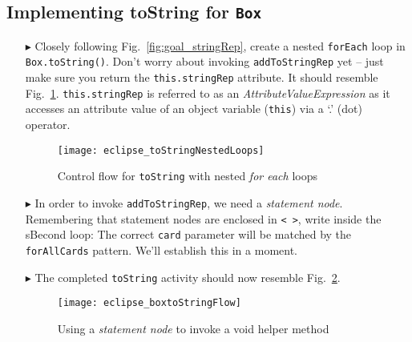 \newpage
\hypertarget{stringRep tex}{}
\subsection{Implementing toString for \texttt{Box}}
\texHeader

\vspace{0.5cm}

\begin{itemize}
  
\item[$\blacktriangleright$] Closely following Fig.~\ref{fig:goal_stringRep}, create a nested \texttt{forEach} loop in \texttt{Box.\-to\-Str\-ing()}.
Don't worry about invoking \texttt{addToStringRep} yet -- just make sure you return the \texttt{this.stringRep} attribute. It should resemble
Fig.~\ref{eclipse:emptyLoops}. \texttt{this.stringRep} is referred to as an \emph{AttributeValueExpression} as it
accesses an attribute value of an object variable (\texttt{this}) via a `.' (dot) operator.

\begin{figure}[htp]
\begin{center}
  \texttt{[image: eclipse\_toStringNestedLoops]}
  \caption{Control flow for \texttt{toString} with nested \emph{for each} loops}
  \label{eclipse:emptyLoops}
\end{center}
\end{figure}

\item[$\blacktriangleright$] In order to invoke \texttt{addToStringRep}, we need a \emph{statement node}. Remembering that statement nodes are enclosed in
\texttt{< >}, write inside the sBecond loop:
 The correct \texttt{card} parameter will be matched by the \texttt{forAllCards} pattern. We'll establish this in a moment.

\vspace{0.5cm}

\item[$\blacktriangleright$] The completed \texttt{toString} activity should now resemble Fig.~\ref{eclipse:toStringFlow}.

\vspace{0.5cm}

\begin{figure}[htp]
\begin{center}
  \texttt{[image: eclipse\_boxtoStringFlow]}
  \caption{Using a \emph{statement node} to invoke a void helper method}
  \label{eclipse:toStringFlow}
\end{center}
\end{figure}


\end{itemize}
